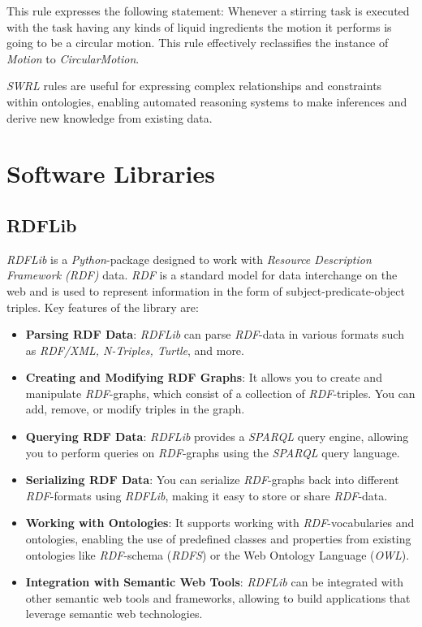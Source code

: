 	This rule expresses the following statement:
	Whenever a stirring task is executed with the task having any kinds of liquid ingredients the motion it performs is going to be a circular motion.
	This rule effectively reclassifies the instance of \textit{Motion} to \textit{CircularMotion}.
	
	
	\textit{SWRL} \cite{Horrocks2004} rules are useful for expressing complex relationships and constraints within ontologies, enabling automated reasoning systems to make inferences and derive new knowledge from existing data.

	\section{Software Libraries}
\label{sec:Libraries}
\subsection{RDFLib}
\label{sec:RDFLib}
\textit{RDFLib} \cite{Krech_RDFLib_2023} is a \textit{Python}-package designed to work with \textit{Resource Description Framework (RDF)} data. \textit{RDF} is a standard model for data interchange on the web and is used to represent information in the form of subject-predicate-object triples. Key features of the library are:

\begin{itemize}
    \item \textbf{Parsing RDF Data}: \textit{RDFLib} can parse \textit{RDF}-data in various formats such as \textit{RDF/XML, N-Triples, Turtle}, and more.
    
    \item \textbf{Creating and Modifying RDF Graphs}: It allows you to create and manipulate \textit{RDF}-graphs, which consist of a collection of \textit{RDF}-triples. You can add, remove, or modify triples in the graph.
    
    \item \textbf{Querying RDF Data}: \textit{RDFLib} provides a \textit{SPARQL} query engine, allowing you to perform queries on \textit{RDF}-graphs using the \textit{SPARQL} query language.
    
    \item \textbf{Serializing RDF Data}: You can serialize \textit{RDF}-graphs back into different \textit{RDF}-formats using \textit{RDFLib}, making it easy to store or share \textit{RDF}-data.
    
    \item \textbf{Working with Ontologies}: It supports working with \textit{RDF}-vocabularies and ontologies, enabling the use of predefined classes and properties from existing ontologies like \textit{RDF}-schema (\textit{RDFS}) or the Web Ontology Language (\textit{OWL}).
    
    \item \textbf{Integration with Semantic Web Tools}: \textit{RDFLib} can be integrated with other semantic web tools and frameworks, allowing to build applications that leverage semantic web technologies.
\end{itemize}


